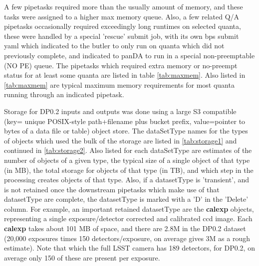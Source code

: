 \documentclass[OPS,authoryear,toc]{lsstdoc}
\begin{document}
A few pipetasks required more than the usually amount of memory, and
these tasks were assigned to a higher max memory queue.  Also, a few 
related Q/A pipetasks occasionally required exceedingly long runtimes on
selected quanta, these were handled by a special 'rescue' submit job,
with its own bps submit yaml which indicated to the butler to only run
on quanta which did not previously complete, and indicated to panDA to run
in a special non-preemptable (NO PE) queue. The pipetasks which required 
extra memory or no-preempt status for at least some quanta are listed in
table \ref{tab:maxmem}.  Also listed in \ref{tab:maxmem} are typical
maximum memory requirements for most quanta running through an indicated
pipetask.

Storage for DP0.2 inputs and outputs was done using a large S3 compatible
(key= unique POSIX-style path+filename plus bucket prefix, value=pointer
to bytes of a data file or table) object store.   The dataSetType names for
the types of objects which used the bulk of the storage are listed in
\ref{tab:storage1} and continued in \ref{tab:storage2}.  Also listed
for each dataSetType are estimates of the number of objects of a given type,
the typical size of a single object of that type (in MB), the total
storage for objects of that type (in TB), and which step in the processing
creates objects of that type.  Also, if a datasetType is 'transient', and 
is not retained once the downstream pipetasks which make use of that
datasetType are complete, the datasetType is marked with a 'D' in the 'Delete'
column.  For example, an important retained datasetType are the {\bf calexp} objects, representing a single exposure/detector corrected and calibrated
ccd image.  Each {\bf calexp} takes about 101 MB of space, and there are 2.8M 
in the DP0.2 dataset (20,000 exposures times 150 detectors/exposure, on average gives 3M as a rough estimate).  Note that which the full LSST camera has 189
detectors, for DP0.2, on average only 150 of these are present per exposure.
\end{document}
